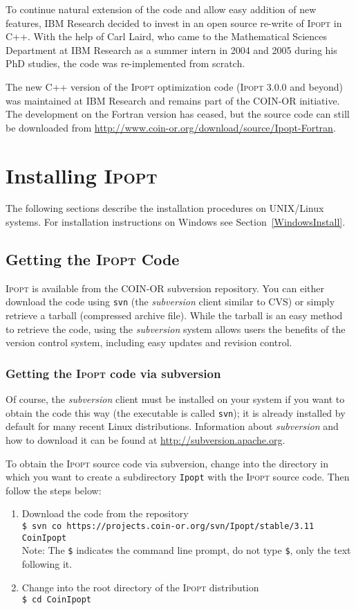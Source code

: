 \documentclass[10pt]{article}
\newcommand{\Ipopt}{\textsc{Ipopt}\xspace}
\begin{document}
To continue natural extension of the code and allow easy addition of
new features, IBM Research decided to invest in an open source
re-write of \Ipopt in C++.  With the help of Carl Laird, who came to
the Mathematical Sciences Department at IBM Research as a summer
intern in 2004 and 2005 during his PhD studies, the code was
re-implemented from scratch.

The new C++ version of the \Ipopt optimization code (\Ipopt 3.0.0
and beyond) was maintained at IBM Research and remains part of the
COIN-OR initiative. The development on the Fortran version has
ceased, but the source code can still be downloaded from \url{http://www.coin-or.org/download/source/Ipopt-Fortran}.

\section{Installing \Ipopt}\label{Installing}

The following sections describe the installation procedures on
UNIX/Linux systems.  For installation instructions on Windows
see Section~\ref{WindowsInstall}.

\subsection{Getting the \Ipopt Code}
\Ipopt is available from the COIN-OR subversion repository. You can
either download the code using \texttt{svn} (the
\textit{subversion} client similar to CVS) or
simply retrieve a tarball (compressed archive file).  While the
tarball is an easy method to retrieve the code, using the
\textit{subversion} system allows users the benefits of the version
control system, including easy updates and revision control.

\subsubsection{Getting the \Ipopt code via subversion}

Of course, the \textit{subversion} client must be installed on your
system if you want to obtain the code this way (the executable is
called \texttt{svn}); it is already installed by default for many
recent Linux distributions.  Information about \textit{subversion} and
how to download it can be found at
\url{http://subversion.apache.org}.

To obtain the \Ipopt source code via subversion, change into the
directory in which you want to create a subdirectory {\tt Ipopt} with
the \Ipopt source code.  Then follow the steps below:
\begin{enumerate}
\item{Download the code from the repository}\\
{\tt \$ svn co https://projects.coin-or.org/svn/Ipopt/stable/3.11 CoinIpopt} \\
Note: The {\tt \$} indicates the command line
prompt, do not type {\tt \$}, only the text following it.
\item Change into the root directory of the \Ipopt distribution\\
{\tt \$ cd CoinIpopt}
\end{enumerate}
\end{document}
